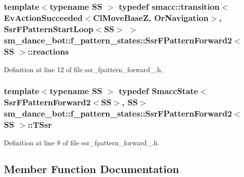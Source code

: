 \subsubsection[{\texorpdfstring{reactions}{reactions}}]{\setlength{\rightskip}{0pt plus 5cm}template$<$typename SS $>$ typedef {\bf smacc\+::transition}$<$Ev\+Action\+Succeeded$<${\bf Cl\+Move\+BaseZ}, {\bf Or\+Navigation}$>$, {\bf Ssr\+F\+Pattern\+Start\+Loop}$<$SS$>$ $>$ {\bf sm\+\_\+dance\+\_\+bot\+::f\+\_\+pattern\+\_\+states\+::\+Ssr\+F\+Pattern\+Forward2}$<$ SS $>$\+::{\bf reactions}}\hypertarget{structsm__dance__bot_1_1f__pattern__states_1_1SsrFPatternForward2_a1e795a04adad807d27f639d8b6ec24f0}{}\label{structsm__dance__bot_1_1f__pattern__states_1_1SsrFPatternForward2_a1e795a04adad807d27f639d8b6ec24f0}


Definition at line 12 of file ssr\+\_\+fpattern\+\_\+forward\+\_.\+h.

\subsubsection[{\texorpdfstring{T\+Ssr}{TSsr}}]{\setlength{\rightskip}{0pt plus 5cm}template$<$typename SS $>$ typedef {\bf Smacc\+State}$<${\bf Ssr\+F\+Pattern\+Forward2}$<$SS$>$, SS$>$ {\bf sm\+\_\+dance\+\_\+bot\+::f\+\_\+pattern\+\_\+states\+::\+Ssr\+F\+Pattern\+Forward2}$<$ SS $>$\+::{\bf T\+Ssr}}\hypertarget{structsm__dance__bot_1_1f__pattern__states_1_1SsrFPatternForward2_a79c9e4c2ac34bbc1b33ff9f7b7e0080a}{}\label{structsm__dance__bot_1_1f__pattern__states_1_1SsrFPatternForward2_a79c9e4c2ac34bbc1b33ff9f7b7e0080a}


Definition at line 8 of file ssr\+\_\+fpattern\+\_\+forward\+\_.\+h.



\subsection{Member Function Documentation}
